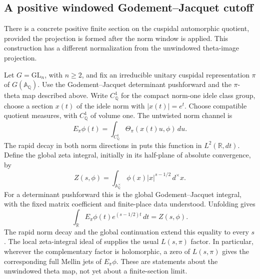 \subsection{A positive windowed Godement--Jacquet cutoff}
\label{glnw:section}

There is a concrete positive finite section on the cuspidal automorphic
quotient, provided the projection is formed after the norm window is
applied. This construction has a different normalization from the
unwindowed theta-image projection.

Let $G=\mathrm{GL}_n$, with $n\geq2$, and fix an irreducible
unitary cuspidal representation $\pi$ of $G(\mathbb A_\mathbb Q)$. Use the
Godement--Jacquet determinant pushforward and the $\pi$-theta map
described above. Write $C_\mathbb Q^1$ for the compact norm-one
idele class group, choose a section $x(t)$ of the idele norm with
$|x(t)|=e^t$. Choose compatible quotient measures, with
$C_\mathbb Q^1$ of volume one. The untwisted
norm channel is
\[
 E_\pi\phi(t)=\int_{C_\mathbb Q^1}
                   \Theta_\pi(x(t)u,\phi)\,du .
\]
The rapid decay in both norm directions in
\citet[Proposition~8.1, p.~49]{jiangluo2023} puts this function
in $L^2(\mathbb R,dt)$. Define the global zeta integral, initially
in its half-plane of absolute convergence, by
\[
 Z(s,\phi)=\int_{\mathbb A_\mathbb Q^\times}
               \phi(x)|x|^{s-1/2}\,d^\times x.
\]
For a determinant pushforward this is the global
Godement--Jacquet integral, with the fixed matrix coefficient and
finite-place data understood. Unfolding gives
\begin{equation}\label{glnw:mellin}
 \int_{\mathbb R}E_\pi\phi(t)e^{(s-1/2)t}\,dt=Z(s,\phi).
\end{equation}
The rapid norm decay and the global continuation extend this equality
to every $s$. The local zeta-integral ideal of
\citet[Theorem~2.4(2), p.~10]{jiangluo2023} supplies the usual
$L(s,\pi)$ factor. In particular, wherever the complementary factor is
holomorphic, a zero of $L(s,\pi)$ gives the corresponding full Mellin
jets of $E_\pi\phi$. These are statements about the unwindowed theta
map, not yet about a finite-section limit.

